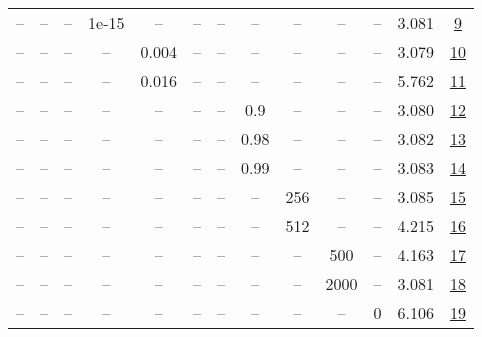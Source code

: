 \begin{table}[H]
\begin{tabular}{ccccccccccccc}
-- & -- & -- & 1e-15 & -- & -- & -- & -- & -- & -- & -- & 3.081 & \href{https://wandb.ai/stanford-mercury/optimizer-scaling/runs/sweep-520m-10B-soapere3988b4lr0.008-wd0.1-minlr0-warmup1000-b10.-d09977}{9} \\
-- & -- & -- & -- & 0.004 & -- & -- & -- & -- & -- & -- & 3.079 & \href{https://wandb.ai/stanford-mercury/optimizer-scaling/runs/sweep-520m-10B-soapere5a76ddlr0.004-wd0.1-minlr0-warmup1000-b10.-7df59a}{10} \\
-- & -- & -- & -- & 0.016 & -- & -- & -- & -- & -- & -- & 5.762 & \href{https://wandb.ai/stanford-mercury/optimizer-scaling/runs/sweep-520m-10B-soapere3bcd83lr0.016-wd0.1-minlr0-warmup1000-b10.-758213}{11} \\
-- & -- & -- & -- & -- & -- & -- & 0.9 & -- & -- & -- & 3.080 & \href{https://wandb.ai/stanford-mercury/optimizer-scaling/runs/sweep-520m-10B-soape1b25d4lr0.008-wd0.1-minlr0-warmup1000-b10.95-bb4d5a}{12} \\
-- & -- & -- & -- & -- & -- & -- & 0.98 & -- & -- & -- & 3.082 & \href{https://wandb.ai/stanford-mercury/optimizer-scaling/runs/sweep-520m-10B-soape764fd7lr0.008-wd0.1-minlr0-warmup1000-b10.95-748078}{13} \\
-- & -- & -- & -- & -- & -- & -- & 0.99 & -- & -- & -- & 3.083 & \href{https://wandb.ai/stanford-mercury/optimizer-scaling/runs/sweep-520m-10B-soapea85fd8lr0.008-wd0.1-minlr0-warmup1000-b10.95-2042a4}{14} \\
-- & -- & -- & -- & -- & -- & -- & -- & 256 & -- & -- & 3.085 & \href{https://wandb.ai/stanford-mercury/optimizer-scaling/runs/sweep-520m-10B-soapere27ec25lr0.008-wd0.1-minlr0-warmup1000-b10.-9cbc3a}{15} \\
-- & -- & -- & -- & -- & -- & -- & -- & 512 & -- & -- & 4.215 & \href{https://wandb.ai/stanford-mercury/optimizer-scaling/runs/sweep-520m-10B-soaperec2fec9lr0.008-wd0.1-minlr0-warmup1000-b10.-de71be}{16} \\
-- & -- & -- & -- & -- & -- & -- & -- & -- & 500 & -- & 4.163 & \href{https://wandb.ai/stanford-mercury/optimizer-scaling/runs/sweep-520m-10B-soapeb8c2b1lr0.008-wd0.1-minlr0-warmup500-b10.95--33bd8b}{17} \\
-- & -- & -- & -- & -- & -- & -- & -- & -- & 2000 & -- & 3.081 & \href{https://wandb.ai/stanford-mercury/optimizer-scaling/runs/sweep-520m-10B-soapere1fb540lr0.008-wd0.1-minlr0-warmup2000-b10.-b6ee8b}{18} \\
-- & -- & -- & -- & -- & -- & -- & -- & -- & -- & 0 & 6.106 & \href{https://wandb.ai/stanford-mercury/optimizer-scaling/runs/sweep-520m-10B-soapere81b78alr0.008-wd0-minlr0-warmup1000-b10.95-d397e5}{19} \\

\end{tabular}
\end{table}
